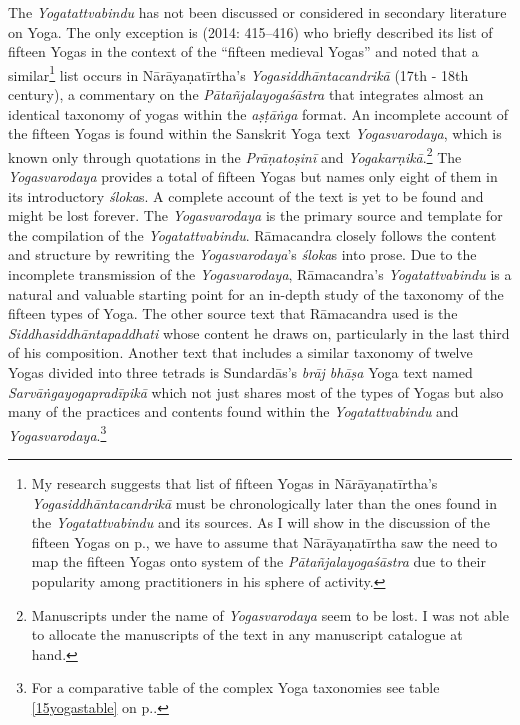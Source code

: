 The \textit{Yogatattvabindu} has not been discussed or considered in secondary literature on Yoga. The only exception is \citeauthor{birch2014} (2014: 415–416) who briefly described its list of fifteen Yogas in the context of the “fifteen medieval Yogas” and noted that a similar\footnote{My research suggests that list of fifteen Yogas in Nārāyaṇatīrtha’s \textit{Yogasiddhāntacandrikā} must be chronologically later than the ones found in the \textit{Yogatattvabindu} and its sources. As I will show in the discussion of the fifteen Yogas on p.\pageref{15yogas}, we have to assume that Nārāyaṇatīrtha saw the need to map the fifteen Yogas onto system of the \textit{Pātañjalayogaśāstra} due to their popularity among practitioners in his sphere of activity.} list occurs in Nārāyaṇatīrtha’s \textit{Yogasiddhāntacandrikā} (17th - 18th century), a commentary on the \textit{Pātañjalayogaśāstra} that integrates almost an identical taxonomy of yogas within the \textit{aṣṭāṅga} format. An incomplete account of the fifteen Yogas is found within the Sanskrit Yoga text \textit{Yogasvarodaya}, which is known only through quotations in the \textit{Prāṇatoṣinī} and \textit{Yogakarṇikā}.\footnote{Manuscripts under the name of \textit{Yogasvarodaya} seem to be lost. I was not able to allocate the manuscripts of the text in any manuscript catalogue at hand.} The \textit{Yogasvarodaya} provides a total of fifteen Yogas but names only eight of them in its introductory \textit{śloka}s. A complete account of the text is yet to be found and might be lost forever. The \textit{Yogasvarodaya} is the primary source and template for the compilation of the \textit{Yogatattvabindu}. Rāmacandra closely follows the content and structure by rewriting the \textit{Yogasvarodaya}’s \textit{śloka}s into prose. Due to the incomplete transmission of the \textit{Yogasvarodaya}, Rāmacandra’s \textit{Yogatattvabindu} is a natural and valuable starting point for an in-depth study of the taxonomy of the fifteen types of Yoga. The other source text that Rāmacandra used is the \textit{Siddhasiddhāntapaddhati} whose content he draws on, particularly in the last third of his composition. Another text that includes a similar taxonomy of twelve Yogas divided into three tetrads is Sundardās’s \textit{brāj bhāṣa} Yoga text named \textit{Sarvāṅgayogapradīpikā} which not just shares most of the types of Yogas but also many of the practices and contents found within the \textit{Yogatattvabindu} and \textit{Yogasvarodaya}.\footnote{For a comparative table of the complex Yoga taxonomies see table \ref{15yogastable} on p.\pageref{15yogastable}.}

